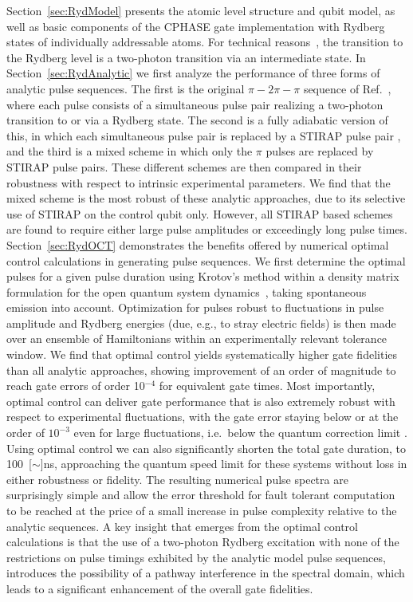 Section~\ref{sec:RydModel}
presents the atomic level structure and qubit model, as well as basic
components of the CPHASE gate implementation with
Rydberg states of individually addressable atoms.
For technical reasons~\cite{GaetanNatPhys2009,WilkPRL10}, the
transition to the Rydberg level is 
a two-photon transition via an intermediate state.
In Section~\ref{sec:RydAnalytic} we first analyze the performance of three forms of
analytic pulse sequences.
The first is the original $\pi - 2\pi-\pi$ sequence
of Ref.~\cite{JakschPRL00}, where each pulse consists of a simultaneous pulse pair
realizing a two-photon transition to or via a Rydberg state.
The second is a fully adiabatic version of this, in which each simultaneous pulse pair is
replaced by a STIRAP pulse pair \cite{rao2014stirap},
and the third is a mixed scheme in which only the $\pi$
pulses are replaced by STIRAP pulse pairs.  These different schemes are then
compared in their robustness with respect to intrinsic experimental parameters.
We find that the mixed scheme is the most robust of these analytic approaches,
due to its selective use of STIRAP on the control qubit only.  However, all
STIRAP based schemes are found to require either large pulse
amplitudes or exceedingly long 
pulse times.  Section~\ref{sec:RydOCT} demonstrates the benefits offered by
numerical optimal control calculations in generating pulse sequences.
We first determine the optimal pulses  for a given pulse duration using 
Krotov's method \cite{Konnov99,PalaoPRA03,ReichKochJCP12}
within a density matrix formulation for the open quantum system
dynamics~\cite{Goerz3States}, taking 
spontaneous emission into account.  Optimization for pulses robust to
fluctuations in pulse amplitude and Rydberg energies (due, e.g., to
stray electric fields) is then made over an ensemble of Hamiltonians within an
experimentally relevant tolerance window.  We find that optimal control yields
systematically higher gate fidelities than all analytic approaches, showing
improvement of an order of magnitude to reach gate errors of order 10$^{-4}$
for equivalent gate times.  Most importantly, optimal control can deliver gate
performance that is also extremely robust with respect to experimental
fluctuations, with the gate error staying below or at the order of $10^{-3}$
even for large fluctuations, i.e.\ below the quantum correction limit
\cite{aliferis2008err}.
Using optimal control we can also significantly shorten the total gate duration,
to \SI{100}[$\sim$]{ns}, approaching the quantum speed limit for these systems without
loss in either robustness or fidelity.  The resulting numerical
pulse spectra are surprisingly simple and allow the
error threshold for fault tolerant computation to be reached at the price of a small
increase in pulse complexity relative to the analytic sequences.
A key insight that emerges from the optimal control calculations is that the use of a two-photon Rydberg excitation with none of the restrictions on pulse timings exhibited by the analytic model pulse sequences, introduces the possibility
of a pathway interference in the spectral domain, which leads to a significant enhancement of the overall gate fidelities. 

